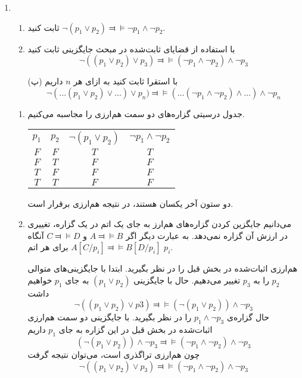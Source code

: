 \documentclass[12pt, 14paper]{article}
\begin{document}
\begin{enumerate}
\begin{ans}
\begin{enumerate}
  \end{enumerate}
\end{ans}

\item
\begin{enumerate}
\item
ثابت کنید
$\neg(p_1\vee p_2)\Dashv\vDash\neg p_1\wedge\neg p_2$.

\item
با استفاده از قضایای ثابت‌شده در مبحث جایگزینی ثابت کنید
$$\neg((p_1\vee p_2)\vee p_3)\Dashv\vDash (\neg p_1 \wedge \neg p_2)\wedge\neg p_3$$

\item[(پ)]
با استقرا ثابت کنید به ازای هر $n$ داریم
$$\neg(\ldots(p_1\vee p_2)\vee \ldots)\vee p_n)\Dashv\vDash (\ldots(\neg p_1\wedge \neg p_2)\wedge\ldots)\wedge\neg p_n$$
\end{enumerate}\quad\vspace{-9mm}
\begin{ans}
  \begin{enumerate}
    \item جدول درسیتی گزاره‌های دو سمت هم‌ارزی را مجاسبه می‌کنیم.
    \begin{LTR}
      \begin{tabular}{| c | c | c | c |}
        $p_1$ & $p_2$ & $\neg (p_1 \vee p_2)$ & $\neg p_1 \wedge \neg p_2$ \\
        $F$ & $F$ & $T$ & $T$ \\
        $F$ & $T$ & $F$ & $F$ \\
        $T$ & $F$ & $F$ & $F$ \\
        $T$ & $T$ & $F$ & $F$
      \end{tabular}
    \end{LTR}
    دو ستون آخر یکسان هستند، در نتیجه هم‌ارزی برقرار است.

    \item
    می‌دانیم جایگزین کردن گزاره‌های هم‌ارز به جای یک اتم در یک گزاره، تغییری در ارزش آن گزاره نمی‌دهد. به عبارت دیگر اگر
    $A \Dashv\vDash B$ و
    $C \Dashv\vDash D$
    آنگاه
    $A[C/p_i] \Dashv\vDash B[D/p_i]$
    برای هر اتم $p_i$.

    هم‌ارزی اثبات‌شده در بخش قبل را در نظر بگیرید. ابتدا با جایگزینی‌های متوالی $p_2$ را به $p_3$ تغییر می‌دهیم.
    حال با جایگزینی
    $(p_1 \vee p_2)$
    به جای
    $p_1$
    خواهیم داشت
    $$ \neg ((p_1 \vee p_2) \vee p3) \Dashv\vDash (\neg (p_1 \vee p_2)) \wedge \neg p_3 $$
    حال گزاره‌ی
    $p_1 \wedge \neg p_3$
    را در نظر بگیرید. با جایگزینی دو سمت هم‌ارزی اثبات‌شده در بخش قبل در این گزاره به جای
    $p_1$
    داریم
    $$ (\neg (p_1 \vee p_2)) \wedge \neg p_3 \Dashv\vDash (\neg p_1 \wedge \neg p_2) \wedge \neg p_3 $$
    چون هم‌ارزی تراگذری است، می‌توان نتیجه گرفت
    $$ \neg((p_1\vee p_2)\vee p_3)\Dashv\vDash (\neg p_1 \wedge \neg p_2)\wedge\neg p_3 $$


\end{enumerate}
\end{ans}
\end{enumerate}
\end{document}
